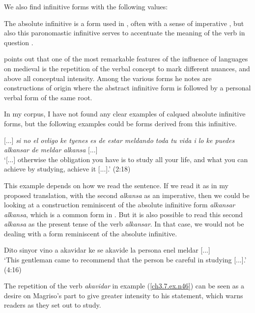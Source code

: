 \documentclass[output=paper,colorlinks,citecolor=brown,babel,arabicfont]{langscibook}
\begin{document}
We also find infinitive forms with the following values:

\label{ch3.7.ss.3.3.5.1}

The absolute infinitive is a form used in , often with a sense of imperative \citep[213]{donnez-guez2013}, but also this paronomastic infinitive serves to accentuate the meaning of the verb in question \citet[241]{bornes-varol2008}. 

\citet[250]{sola-sole1983} points out that one of the most remarkable features of the influence of  languages on medieval  is the repetition of the verbal concept to mark different nuances, and above all conceptual intensity. Among the various forms he notes are constructions of  origin where the abstract infinitive form is followed by a personal verbal form of the same root. 

In my corpus, I have not found any clear examples of calqued absolute infinitive forms, but the following examples could be forms derived from this infinitive. 

\ea\label{ch3.7.ex.n45}
{[...]} \textit{si no el ovligo ke tyenes es de estar meldando toda tu vida i lo ke puedes alkansar de meldar alkansa} {[...]} \\
`{[...]} otherwise the obligation you have is to study all your life, and what you can achieve by studying, achieve it {[...]}.'
(2:18)
\z


This example depends on how we read the sentence. If we read it as in my proposed translation, with the second \textit{alkansa} as an imperative, then we could be looking at a construction reminiscent of the absolute infinitive form \textit{alkansar alkansa}, which is a common form in . But it is also possible to read this second \textit{alkansa} as the present tense of the verb \textit{alkansar}. In that case, we would not be dealing with a form reminiscent of the absolute infinitive. 

\ea\label{ch3.7.ex.n46}
Dito sinyor vino a akavidar ke se akavide la persona enel meldar {[...]} \\
`This gentleman came to recommend that the person be careful in studying {[...]}.' (4:16)
\z

The repetition of the verb \textit{akavidar} in example (\ref{ch3.7.ex.n46}) can be seen as a desire on Magriso's part to give greater intensity to his statement, which warns readers as they set out to study. 
\end{document}
